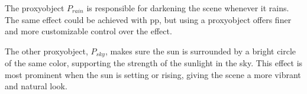 \noindent
The \gls{proxyobject} \color{darkercyan}$P_{rain}$ \color{black} is responsible for darkening the scene whenever it rains.
The same effect could be achieved with \gls{pp}, but using a \gls{proxyobject} offers finer and more customizable control over the effect.

\begin{figure}[H]
    \centering
    \label{img:techimpl:rainproxy}
\end{figure}

\noindent
The other \gls{proxyobject}, \color{darkercyan}$P_{sky}$\color{black}, makes sure the sun is surrounded by a bright circle of the same color, supporting the strength of the sunlight in the sky.
This effect is most prominent when the sun is setting or rising, giving the scene a more vibrant and natural look.


